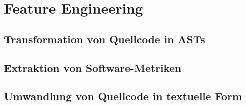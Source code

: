 \section{Feature Engineering}

\subsection{Transformation von Quellcode in ASTs}

\subsection{Extraktion von Software-Metriken}

\subsection{Umwandlung von Quellcode in textuelle Form}

